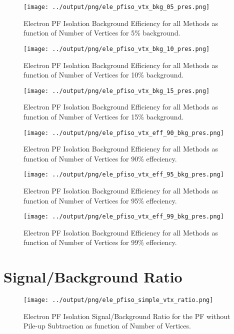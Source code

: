 \documentclass[11pt]{book}
\begin{document}
\begin{figure}[htb]
\centering
\texttt{[image: ../output/png/ele\_pfiso\_vtx\_bkg\_05\_pres.png]}
\caption{Electron PF Isolation Background Efficiency for all Methods as function of Number of Vertices for 5\% background.}
\label{fig:ele_pfiso_vtx_bkg_05_pres}
\end{figure}

\begin{figure}[htb]
\centering
\texttt{[image: ../output/png/ele\_pfiso\_vtx\_bkg\_10\_pres.png]}
\caption{Electron PF Isolation Background Efficiency for all Methods as function of Number of Vertices for 10\% background.}
\label{fig:ele_pfiso_vtx_bkg_10_pres}
\end{figure}

\begin{figure}[htb]
\centering
\texttt{[image: ../output/png/ele\_pfiso\_vtx\_bkg\_15\_pres.png]}
\caption{Electron PF Isolation Background Efficiency for all Methods as function of Number of Vertices for 15\% background.}
\label{fig:ele_pfiso_vtx_bkg_15_pres}
\end{figure}

\begin{figure}[htb]
\centering
\texttt{[image: ../output/png/ele\_pfiso\_vtx\_eff\_90\_bkg\_pres.png]}
\caption{Electron PF Isolation Background Efficiency for all Methods as function of Number of Vertices for 90\% effeciency.}
\label{fig:ele_pfiso_vtx_eff_90_bkg_pres}
\end{figure}

\begin{figure}[htb]
\centering
\texttt{[image: ../output/png/ele\_pfiso\_vtx\_eff\_95\_bkg\_pres.png]}
\caption{Electron PF Isolation Background Efficiency for all Methods as function of Number of Vertices for 95\% effeciency.}
\label{fig:ele_pfiso_vtx_eff_95_bkg_pres}
\end{figure}

\begin{figure}[htb]
\centering
\texttt{[image: ../output/png/ele\_pfiso\_vtx\_eff\_99\_bkg\_pres.png]}
\caption{Electron PF Isolation Background Efficiency for all Methods as function of Number of Vertices for 99\% effeciency.}
\label{fig:ele_pfiso_vtx_eff_99_bkg_pres}
\end{figure}
\clearpage

\chapter{Signal/Background Ratio}
\begin{figure}[htb]
\centering
\texttt{[image: ../output/png/ele\_pfiso\_simple\_vtx\_ratio.png]}
\caption{Electron PF Isolation Signal/Background Ratio for the PF without Pile-up Subtraction as function of Number of Vertices.}
\label{fig:ele_pfiso_vtx_ratio_simple}
\end{figure}
\end{document}
